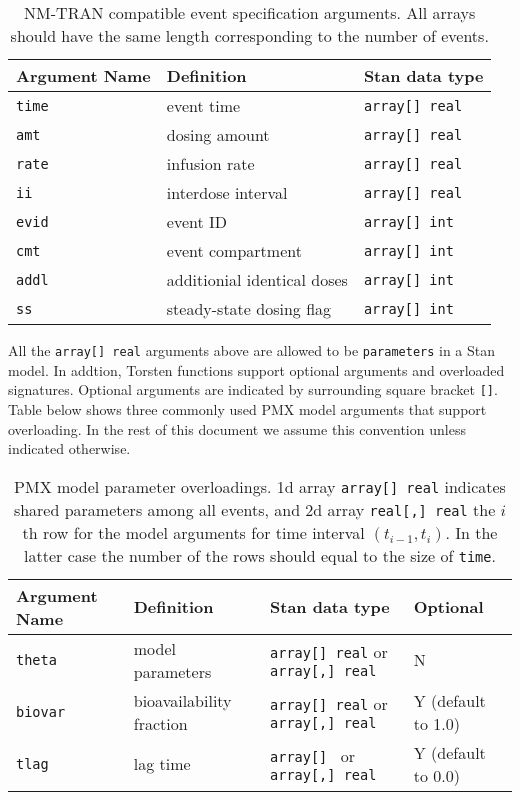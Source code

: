 \documentclass[12pt, reqno, oneside]{amsbook}
\numberwithin{equation}{chapter}
\numberwithin{figure}{chapter}
\numberwithin{table}{chapter}
\theoremstyle{remark}
\begin{document}
\begin{table}[htbp]
\caption{\label{tab:event_args}NM-TRAN compatible event specification arguments. All arrays should have the same length corresponding to the number of events.}
\centering
\begin{tabular}{lll}
Argument Name & Definition & Stan data type\\
\hline
\texttt{time} & event time & \texttt{array[] real}\\
\texttt{amt} & dosing amount & \texttt{array[] real}\\
\texttt{rate} & infusion rate & \texttt{array[] real}\\
\texttt{ii} & interdose interval & \texttt{array[] real}\\
\texttt{evid} & event ID & \texttt{array[] int}\\
\texttt{cmt} & event compartment & \texttt{array[] int}\\
\texttt{addl} & additionial identical doses & \texttt{array[] int}\\
\texttt{ss} & steady-state dosing flag & \texttt{array[] int}\\
\hline
\end{tabular}
\end{table}
All the \texttt{array[] real} arguments above are allowed to
be \texttt{parameters} in a Stan model.
In addtion, Torsten functions
support optional arguments and overloaded signatures.
Optional arguments are indicated by surrounding square bracket \texttt{[]}.
Table below shows three commonly used PMX model arguments that support
overloading. In the rest of this document we assume this convention unless indicated otherwise.

\begin{table}[htbp]
\caption{\label{tab:event_params}PMX model parameter overloadings. 1d array \texttt{array[] real} indicates shared parameters among all events, and 2d array \texttt{real[,] real} the \(i\)th row for the model arguments for time interval \((t_{i-1}, t_i)\). In the latter case the number of the rows should equal to the size of \texttt{time}.}
\centering
\footnotesize
\begin{tabular}{llll}
Argument Name & Definition & Stan data type & Optional\\
\hline
\texttt{theta} & model parameters & \texttt{array[] real} or \texttt{array[,] real} & N\\
\texttt{biovar} & bioavailability fraction & \texttt{array[] real} or \texttt{array[,] real} & Y (default to 1.0)\\
\texttt{tlag} & lag time & \texttt{array[] } or \texttt{array[,] real} & Y (default to 0.0)\\
\hline
\end{tabular}
\normalsize
\end{table}
\end{document}
